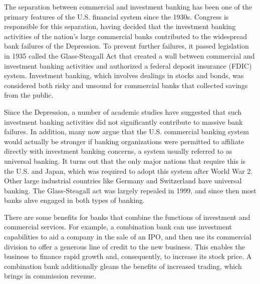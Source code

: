 \documentclass{article}
\begin{document}
  The separation between commercial and investment banking has been one of the primary features of the U.S. financial system since the 1930s. Congress is responsible for this separation, having decided that the investment banking activities of the nation's large commercial banks contributed to the widespread bank failures of the Depression. To prevent further failures, it passed legislation in 1935 called the Glass-Steagall Act that created a wall between commercial and investment banking activities and authorized a federal deposit insurance (FDIC) system. Investment banking, which involves dealings in stocks and bonds, was considered both risky and unsound for commercial banks that collected savings from the public.

  Since the Depression, a number of academic studies have suggested that such investment banking activities did not significantly contribute to massive bank failures. In addition, many now argue that the U.S. commercial banking system would actually be stronger if banking organizations were permitted to affiliate directly with investment banking concerns, a system usually referred to as universal banking. It turns out that the only major nations that require this is the U.S. and Japan, which was required to adopt this system after World War 2. Other large industrial countries like Germany and Switzerland have universal banking. The Glass-Steagall act was largely repealed in 1999, and since then most banks ahve engaged in both types of banking. 

  There are some benefits for banks that combine the functions of investment and commercial services. For example, a combination bank can use investment capabilities to aid a company in the sale of an IPO, and then use its commercial division to offer a generous line of credit to the new business. This enables the business to finance rapid growth and, consequently, to increase its stock price. A combination bank additionally gleans the benefits of increased trading, which brings in commission revenue.
\end{document}
